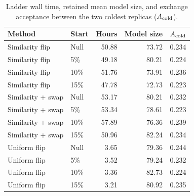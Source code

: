 \begin{table}[t]
\centering
\small
\caption{Ladder wall time, retained mean model size, and exchange acceptance between the two coldest replicas ($A_{\rm cold}$).}
\label{tab:real_data_chain_diagnostics}
\begin{tabular}{llrrr}
\toprule
Method & Start & Hours & Model size & $A_{\rm cold}$ \\
\midrule
Similarity flip & Null & 50.88 & 73.72 & 0.234 \\
Similarity flip & 5\% & 49.18 & 80.21 & 0.224 \\
Similarity flip & 10\% & 51.76 & 73.91 & 0.236 \\
Similarity flip & 15\% & 47.78 & 72.73 & 0.223 \\
Similarity + swap & Null & 53.17 & 80.21 & 0.232 \\
Similarity + swap & 5\% & 53.34 & 78.61 & 0.223 \\
Similarity + swap & 10\% & 57.89 & 76.36 & 0.239 \\
Similarity + swap & 15\% & 50.96 & 82.24 & 0.234 \\
Uniform flip & Null & 3.65 & 79.36 & 0.244 \\
Uniform flip & 5\% & 3.52 & 79.24 & 0.232 \\
Uniform flip & 10\% & 3.36 & 82.73 & 0.224 \\
Uniform flip & 15\% & 3.21 & 80.92 & 0.235 \\
\bottomrule
\end{tabular}
\end{table}
